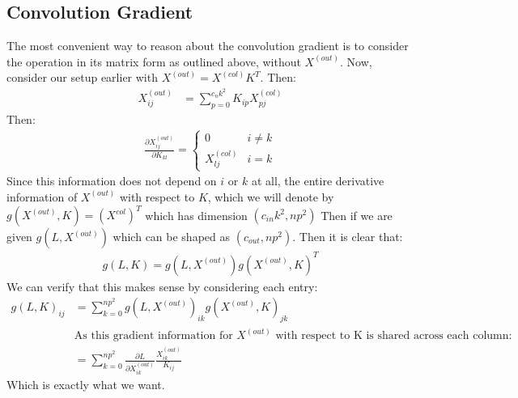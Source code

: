 \documentclass[12pt]{article}
\begin{document}
\subsection*{Convolution Gradient}
The most convenient way to reason about the convolution gradient is to consider
the operation in its matrix form as outlined above, without $X^{(out)}$. Now, consider our setup earlier with
$X^{(out)} = X^{(col)}K^T $. Then:
\begin{align*}
    X^{(out)}_{ij} &= \sum_{p = 0}^{c_nk^2}K_{ip}X^{(col)}_{pj}
\end{align*}
Then:
\begin{align*}
    \frac{\partial  X^{(out)}_{ij}}{\partial K_{kl}} = 
    \begin{cases}
        0 & i \neq k \\
        X^{(col)}_{lj} & i = k
    \end{cases}
\end{align*}
Since this information does not depend on $i$ or $k$ at all, the entire
derivative information of $X^{(out)}$ with respect to $K$, which we will denote
by $g(X^{(out)}, K) = (X^{col})^T$ which has dimension $(c_{in}k^2, np^2)$
Then if we are given $g(L, X^{(out)})$ which can be shaped as $(c_{out}, np^2)$.
Then it is clear that:
\begin{align*}
    g(L, K) = g(L, X^{(out)})g(X^{(out)}, K)^T
\end{align*}
We can verify that this makes sense by considering each entry:
\begin{align*}
    g(L, K)_{ij} &= \sum_{k = 0}^{np^2}g(L, X^{(out)})_{ik}g(X^{(out)}, K)_{jk} \\
    &\text{As this gradient information for $X^{(out)}$ with respect to K is shared across each column:} \\
    &= \sum_{k = 0}^{np^2}\frac{\partial L}{\partial X^{(out)}_{ik}} \frac{X^{(out)}_{ik}}{K_{ij}}
\end{align*}
Which is exactly what we want.
\end{document}
